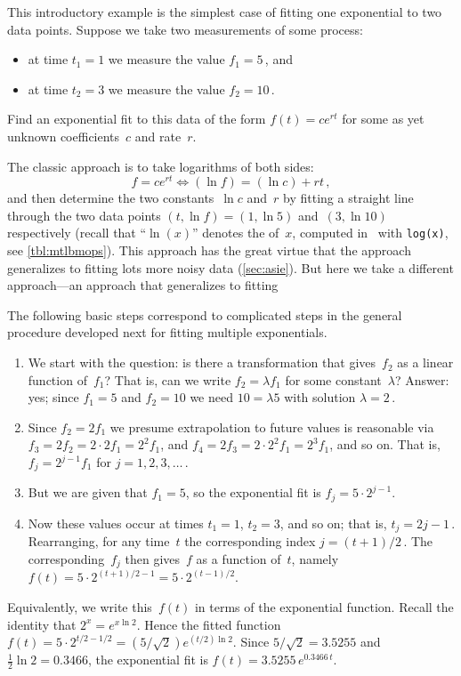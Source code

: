 \begin{example} \label{eg:eidd1}
This introductory example is the simplest case of fitting one exponential to two data points.
Suppose we take two measurements of some process: 
\begin{itemize}
\item at time \(t_1=1\) we measure the value \(f_1=5\)\,, and 
\item at time \(t_2=3\) we measure the value \(f_2=10\)\,.
\end{itemize}
Find an exponential fit to this data of the form \(f(t)=ce^{rt}\) for some as yet unknown coefficients~\(c\) and rate~\(r\).
\begin{solution} 
The classic approach is to take logarithms of both sides:
\begin{equation*}
f=ce^{rt} \iff (\ln f)=(\ln c)+rt\,,
\end{equation*}
and then determine the two constants~\(\ln c\) and~\(r\) by fitting a straight line through the two data points \((t,\ln f)=(1,\ln5)\) and~\((3,\ln10)\) respectively
(recall that ``\(\ln(x)\)'' denotes the  of~\(x\),  computed in \script\ with \verb|log(x)|, see \cref{tbl:mtlbmops}).
This approach has the great virtue that the approach generalizes to fitting lots more noisy data (\cref{sec:asie}).
But here we take a different approach---an approach that generalizes to fitting 


The following basic steps correspond to complicated steps in the general procedure developed next for fitting multiple exponentials.
\begin{enumerate}
\item We start with the question: is there a transformation that gives~\(f_2\) as a linear function of~\(f_1\)?  That is, can we write \(f_2=\lambda f_1\) for some constant~\(\lambda\)?
Answer: yes; since \(f_1=5\) and \(f_2=10\) we need \(10=\lambda5\) with solution \(\lambda=2\)\,.
\item  Since \(f_2=2f_1\) we presume extrapolation to future values is reasonable via \(f_3=2f_2=2\cdot2f_1=2^2f_1\), and \(f_4=2f_3=2\cdot2^2f_1=2^3f_1\), and so on.   
That is, \(f_j=2^{j-1}f_1\) for \(j=1,2,3,\ldots\)\,.
\item But we are given that \(f_1=5\), so the exponential fit is \(f_j=5\cdot2^{j-1}\).
\item Now these values occur at times \(t_1=1\), \(t_2=3\), and so on; that is, \(t_j=2j-1\)\,.
Rearranging, for any time~\(t\) the corresponding index \(j=(t+1)/2\)\,.
The corresponding~\(f_j\) then gives~\(f\) as a function of~\(t\), namely \(f(t) =5\cdot 2^{(t+1)/2-1} =5\cdot 2^{(t-1)/2} \).

\end{enumerate}
Equivalently, we write this~\(f(t)\) in terms of the exponential function.
Recall the identity that \(2^x=e^{x\ln 2}\).
Hence the fitted function \(f(t)=5\cdot 2^{t/2-1/2} =(5/\sqrt2)e^{(t/2)\ln2}\). 
Since \(5/\sqrt2=3.5255\) and \(\frac12\ln 2=0.3466\), the exponential fit is \(f(t)=3.5255\,e^{0.3466\,t}\).
\end{solution}
\end{example}

